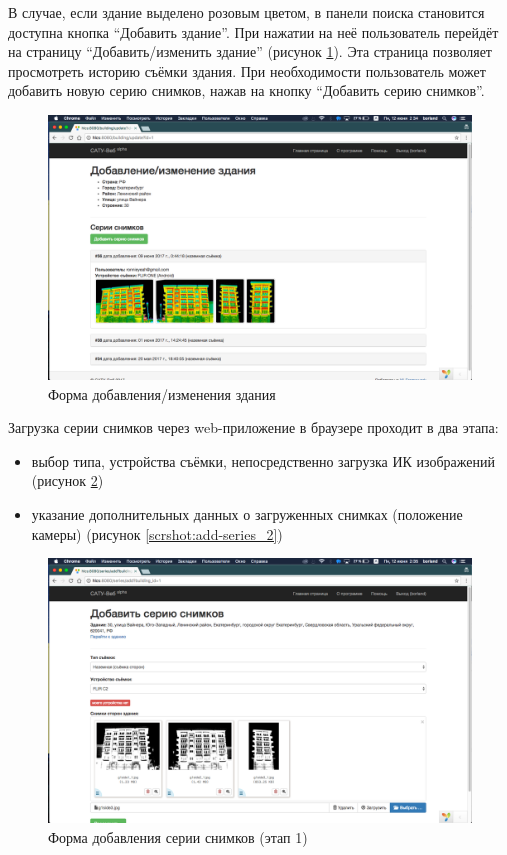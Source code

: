 	В случае, если здание выделено розовым цветом, в панели поиска становится доступна кнопка “Добавить здание”. При нажатии на неё пользователь перейдёт на страницу “Добавить/изменить здание” (рисунок \ref{scrshot:update_1}). Эта страница позволяет просмотреть историю съёмки здания. При необходимости пользователь может добавить новую серию снимков, нажав на кнопку “Добавить серию снимков”.

	\begin{figure}[t!]
		\centering
		\includegraphics[width=1\textwidth]{images/scrshots/update_1}
		\caption{Форма добавления/изменения здания}
		\label{scrshot:update_1}
	\end{figure}

	Загрузка серии снимков через web-приложение в браузере проходит в два этапа: 

	\begin{itemize}
		\item выбор типа, устройства съёмки, непосредственно загрузка ИК изображений (рисунок \ref{scrshot:add-series_1})
		\item указание дополнительных данных о загруженных снимках (положение камеры) (рисунок \ref{scrshot:add-series_2})
	\end{itemize}

	\begin{figure}[t!]
		\centering
		\includegraphics[width=1\textwidth]{images/scrshots/add-series_1}
		\caption{Форма добавления серии снимков (этап 1)}
		\label{scrshot:add-series_1}
	\end{figure}

